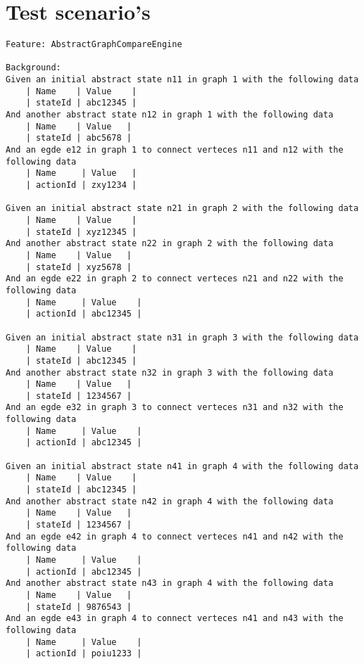\chapter{Test scenario's} \label{appendix:test-scenarios}

\begin{lstlisting}[language=Gherkin,  basicstyle=\tiny, caption=Test Scenario's, label=code:gherkin-tests]
Feature: AbstractGraphCompareEngine

Background:
Given an initial abstract state n11 in graph 1 with the following data
    | Name    | Value    |
    | stateId | abc12345 |
And another abstract state n12 in graph 1 with the following data
    | Name    | Value   |
    | stateId | abc5678 |
And an egde e12 in graph 1 to connect verteces n11 and n12 with the following data
    | Name     | Value   |
    | actionId | zxy1234 |

Given an initial abstract state n21 in graph 2 with the following data
    | Name    | Value    |
    | stateId | xyz12345 |
And another abstract state n22 in graph 2 with the following data
    | Name    | Value   |
    | stateId | xyz5678 |
And an egde e22 in graph 2 to connect verteces n21 and n22 with the following data
    | Name     | Value    |
    | actionId | abc12345 |

Given an initial abstract state n31 in graph 3 with the following data
    | Name    | Value    |
    | stateId | abc12345 |
And another abstract state n32 in graph 3 with the following data
    | Name    | Value   |
    | stateId | 1234567 |
And an egde e32 in graph 3 to connect verteces n31 and n32 with the following data
    | Name     | Value    |
    | actionId | abc12345 |

Given an initial abstract state n41 in graph 4 with the following data
    | Name    | Value    |
    | stateId | abc12345 |
And another abstract state n42 in graph 4 with the following data
    | Name    | Value   |
    | stateId | 1234567 |
And an egde e42 in graph 4 to connect verteces n41 and n42 with the following data
    | Name     | Value    |
    | actionId | abc12345 |
And another abstract state n43 in graph 4 with the following data
    | Name    | Value   |
    | stateId | 9876543 |
And an egde e43 in graph 4 to connect verteces n41 and n43 with the following data
    | Name     | Value    |
    | actionId | poiu1233 | 


\end{lstlisting}
